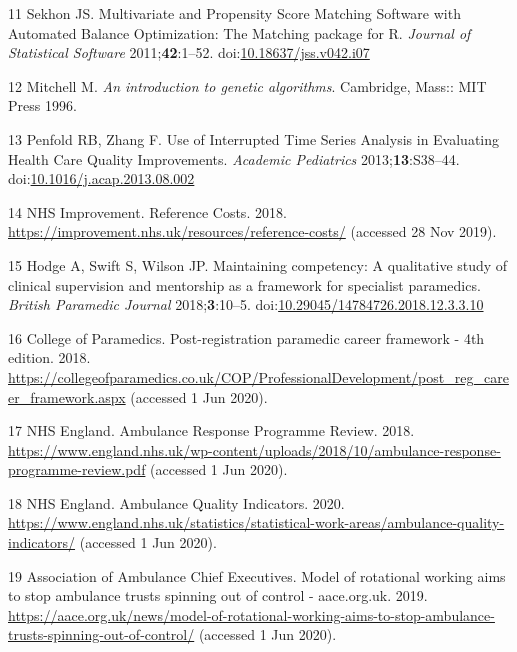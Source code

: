 \documentclass[
  a4paper,
  openany]{article}
\begin{document}
\leavevmode\hypertarget{ref-sekhon_multivariate_2011}{}%
11 Sekhon JS. Multivariate and Propensity Score Matching Software with Automated Balance Optimization: The Matching package for R. \emph{Journal of Statistical Software} 2011;\textbf{42}:1--52. doi:\href{https://doi.org/10.18637/jss.v042.i07}{10.18637/jss.v042.i07}

\leavevmode\hypertarget{ref-mitchell_introduction_1996}{}%
12 Mitchell M. \emph{An introduction to genetic algorithms}. Cambridge, Mass:: MIT Press 1996.

\leavevmode\hypertarget{ref-penfold_use_2013}{}%
13 Penfold RB, Zhang F. Use of Interrupted Time Series Analysis in Evaluating Health Care Quality Improvements. \emph{Academic Pediatrics} 2013;\textbf{13}:S38--44. doi:\href{https://doi.org/10.1016/j.acap.2013.08.002}{10.1016/j.acap.2013.08.002}

\leavevmode\hypertarget{ref-nhs_improvement_reference_2018}{}%
14 NHS Improvement. Reference Costs. 2018. \url{https://improvement.nhs.uk/resources/reference-costs/} (accessed 28 Nov 2019).

\leavevmode\hypertarget{ref-hodge_maintaining_2018}{}%
15 Hodge A, Swift S, Wilson JP. Maintaining competency: A qualitative study of clinical supervision and mentorship as a framework for specialist paramedics. \emph{British Paramedic Journal} 2018;\textbf{3}:10--5. doi:\href{https://doi.org/10.29045/14784726.2018.12.3.3.10}{10.29045/14784726.2018.12.3.3.10}

\leavevmode\hypertarget{ref-college_of_paramedics_post-registration_2018}{}%
16 College of Paramedics. Post-registration paramedic career framework - 4th edition. 2018. \url{https://collegeofparamedics.co.uk/COP/ProfessionalDevelopment/post_reg_career_framework.aspx} (accessed 1 Jun 2020).

\leavevmode\hypertarget{ref-nhs_england_ambulance_2018}{}%
17 NHS England. Ambulance Response Programme Review. 2018. \url{https://www.england.nhs.uk/wp-content/uploads/2018/10/ambulance-response-programme-review.pdf} (accessed 1 Jun 2020).

\leavevmode\hypertarget{ref-nhs_england_ambulance_2020}{}%
18 NHS England. Ambulance Quality Indicators. 2020. \url{https://www.england.nhs.uk/statistics/statistical-work-areas/ambulance-quality-indicators/} (accessed 1 Jun 2020).

\leavevmode\hypertarget{ref-association_of_ambulance_chief_executives_model_2019}{}%
19 Association of Ambulance Chief Executives. Model of rotational working aims to stop ambulance trusts spinning out of control - aace.org.uk. 2019. \url{https://aace.org.uk/news/model-of-rotational-working-aims-to-stop-ambulance-trusts-spinning-out-of-control/} (accessed 1 Jun 2020).
\end{document}
